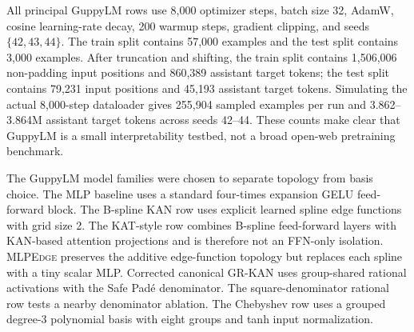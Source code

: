 \documentclass[11pt]{article}
\newcommand{\modelname}[1]{\textsc{#1}}
\newcommand{\grkan}{\modelname{GR-KAN}}
\newcommand{\mlpedge}{\modelname{MLPEdge}}
\begin{document}
All principal GuppyLM rows use 8,000 optimizer steps, batch size 32, AdamW, cosine learning-rate decay, 200 warmup steps, gradient clipping, and seeds \(\{42,43,44\}\). The train split contains 57,000 examples and the test split contains 3,000 examples. After truncation and shifting, the train split contains 1,506,006 non-padding input positions and 860,389 assistant target tokens; the test split contains 79,231 input positions and 45,193 assistant target tokens. Simulating the actual 8,000-step dataloader gives 255,904 sampled examples per run and 3.862--3.864M assistant target tokens across seeds 42--44. These counts make clear that GuppyLM is a small interpretability testbed, not a broad open-web pretraining benchmark.

The GuppyLM model families were chosen to separate topology from basis choice. The MLP baseline uses a standard four-times expansion GELU feed-forward block. The B-spline KAN row uses explicit learned spline edge functions with grid size 2. The KAT-style row combines B-spline feed-forward layers with KAN-based attention projections and is therefore not an FFN-only isolation. \mlpedge{} preserves the additive edge-function topology but replaces each spline with a tiny scalar MLP. Corrected canonical \grkan{} uses group-shared rational activations with the Safe Pad\'{e} denominator. The square-denominator rational row tests a nearby denominator ablation. The Chebyshev row uses a grouped degree-3 polynomial basis with eight groups and tanh input normalization.
\end{document}
